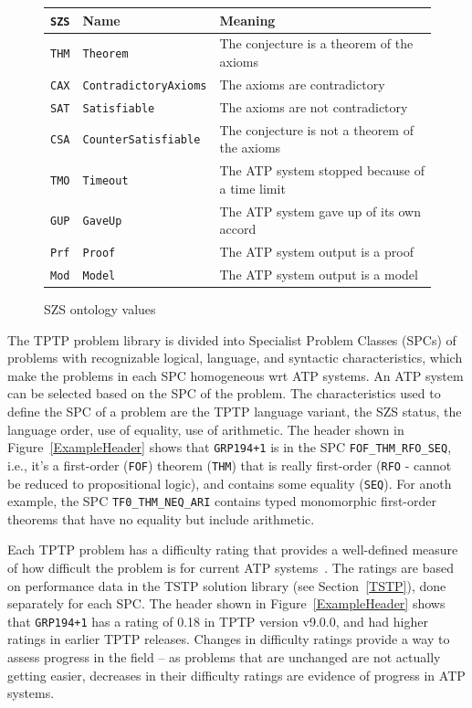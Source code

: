 \documentclass[runningheads]{llncs}
\begin{document}
\begin{figure}[htb]
\centering
\begin{tabular}{lll}
{\tt SZS} & Name                      & Meaning \\
\hline
{\tt THM} & {\tt Theorem}             & The conjecture is a theorem of the axioms \\
{\tt CAX} & {\tt ContradictoryAxioms} & The axioms are contradictory \\
{\tt SAT} & {\tt Satisfiable}         & The axioms are not contradictory \\
{\tt CSA} & {\tt CounterSatisfiable}  & The conjecture is not a theorem of the axioms \\
{\tt TMO} & {\tt Timeout}             & The ATP system stopped because of a time limit \\
{\tt GUP} & {\tt GaveUp}              & The ATP system gave up of its own accord \\
{\tt Prf} & {\tt Proof}               & The ATP system output is a proof \\
{\tt Mod} & {\tt Model}               & The ATP system output is a model \\
\end{tabular}
\caption{SZS ontology values}
\label{SZSTable}
\end{figure} 

The TPTP problem library is divided into Specialist Problem Classes (SPCs) of problems with 
recognizable logical, language, and syntactic characteristics, which make the problems in each 
SPC homogeneous wrt ATP systems.
An ATP system can be selected based on the SPC of the problem.
The characteristics used to define the SPC of a problem are the TPTP language variant, the SZS
status, the language order, use of equality, use of arithmetic.
The header shown in Figure~\ref{ExampleHeader} shows that {\tt GRP194+1} is in the 
SPC {\tt FOF\_THM\_RFO\_SEQ}, i.e., it's a first-order ({\tt FOF}) theorem ({\tt THM}) that
is really first-order ({\tt RFO} - cannot be reduced to propositional logic), and contains some
equality ({\tt SEQ}).
For anoth example, the SPC {\tt TF0\_THM\_NEQ\_ARI} contains typed monomorphic first-order theorems 
that have no equality but include arithmetic.

Each TPTP problem has a difficulty rating that provides a well-defined measure of how difficult 
the problem is for current ATP systems~\cite{SS01}.
The ratings are based on performance data in the TSTP solution library (see Section~\ref{TSTP}), 
done separately for each SPC.
The header shown in Figure~\ref{ExampleHeader} shows that {\tt GRP194+1} has a rating of 0.18 in
TPTP version v9.0.0, and had higher ratings in earlier TPTP releases.
Changes in difficulty ratings provide a way to assess progress in the field -- as problems that 
are unchanged are not actually getting easier, decreases in their difficulty ratings are evidence 
of progress in ATP systems.
\end{document}

